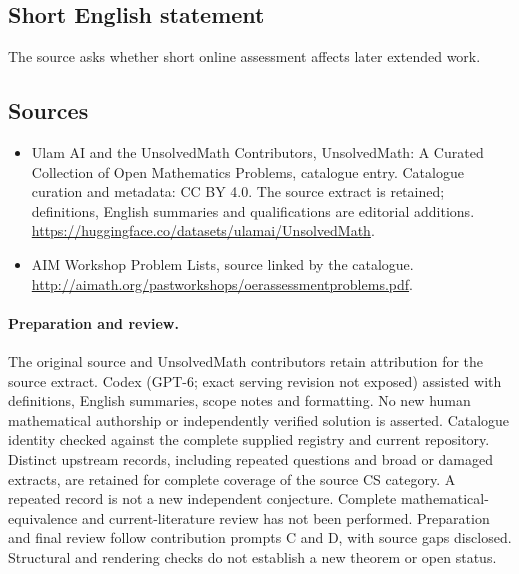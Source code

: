 \documentclass[11pt]{article}
\begin{document}
\subsection{Short English statement}
The source asks whether short online assessment affects later extended work.
\subsection{Sources}
\begin{itemize}
\item[\hypertarget{source:statement:1}{S1}] Ulam AI and the UnsolvedMath Contributors, UnsolvedMath: A Curated Collection of Open Mathematics Problems, catalogue entry. Catalogue curation and metadata: CC BY 4.0. The source extract is retained; definitions, English summaries and qualifications are editorial additions.
\url{https://huggingface.co/datasets/ulamai/UnsolvedMath}.
\item[\hypertarget{source:statement:2}{S2}] AIM Workshop Problem Lists, source linked by the catalogue.
\url{http://aimath.org/pastworkshops/oerassessmentproblems.pdf}.
\end{itemize}
\paragraph{Preparation and review.}
The original source and UnsolvedMath contributors retain attribution for the source extract. Codex (GPT-6; exact serving revision not exposed) assisted with definitions, English summaries, scope notes and formatting. No new human mathematical authorship or independently verified solution is asserted. Catalogue identity checked against the complete supplied registry and current repository. Distinct upstream records, including repeated questions and broad or damaged extracts, are retained for complete coverage of the source CS category. A repeated record is not a new independent conjecture. Complete mathematical-equivalence and current-literature review has not been performed. Preparation and final review follow contribution prompts C and D, with source gaps disclosed. Structural and rendering checks do not establish a new theorem or open status.
\label{end:statement}
\end{document}
